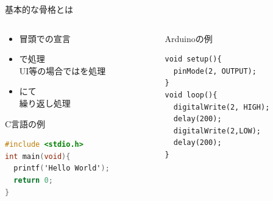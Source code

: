 \documentclass[dvipdfmx]{beamer}
\begin{document}
  \begin{frame}[fragile]{基本的な骨格とは}
    \begin{columns}
      \begin{column}{0.6\textwidth}
        \begin{itemize}
          \item 冒頭での宣言
          \item {}で処理\\UI等の場合ではを処理
          \item {}にて\\繰り返し処理
        \end{itemize}
        \begin{exampleblock}{C言語の例}
          \begin{lstlisting}[language=C]
#include <stdio.h>
int main(void){
  printf('Hello World');
  return 0;
}
    
          \end{lstlisting}
        \end{exampleblock}
      \end{column}
      \begin{column}{0.4\textwidth}
        \begin{exampleblock}{Arduinoの例}
          \begin{lstlisting}[language=Arduino,basicstyle=\footnotesize]
void setup(){
  pinMode(2, OUTPUT);
}
void loop(){
  digitalWrite(2, HIGH);
  delay(200);
  digitalWrite(2,LOW);
  delay(200);
}

          \end{lstlisting}
        \end{exampleblock}
      \end{column}
    \end{columns}
  \end{frame}
  
\end{document}
